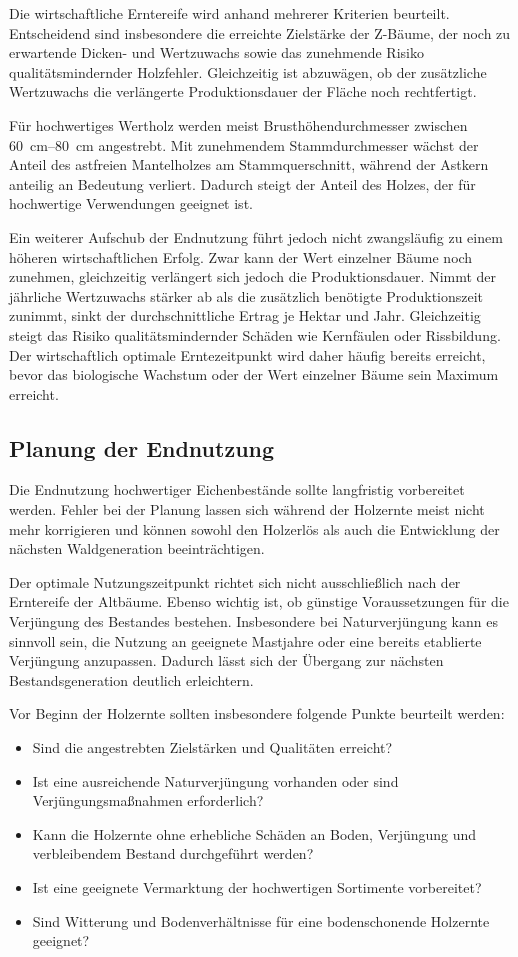 \documentclass[twocolumn, bibliography=totoc, abstract=true]{scrartcl}
\begin{document}
Die wirtschaftliche Erntereife wird anhand mehrerer Kriterien beurteilt. Entscheidend sind insbesondere die erreichte Zielstärke der Z-Bäume, der noch zu erwartende Dicken- und Wertzuwachs sowie das zunehmende Risiko qualitätsmindernder Holzfehler. Gleichzeitig ist abzuwägen, ob der zusätzliche Wertzuwachs die verlängerte Produktionsdauer der Fläche noch rechtfertigt.

Für hochwertiges Wertholz werden meist Brusthöhendurchmesser zwischen \qtyrange{60}{80}{\cm} angestrebt. Mit zunehmendem Stammdurchmesser wächst der Anteil des astfreien Mantelholzes am Stammquerschnitt, während der Astkern anteilig an Bedeutung verliert. Dadurch steigt der Anteil des Holzes, der für hochwertige Verwendungen geeignet ist.

Ein weiterer Aufschub der Endnutzung führt jedoch nicht zwangsläufig zu einem höheren wirtschaftlichen Erfolg. Zwar kann der Wert einzelner Bäume noch zunehmen, gleichzeitig verlängert sich jedoch die Produktionsdauer. Nimmt der jährliche Wertzuwachs stärker ab als die zusätzlich benötigte Produktionszeit zunimmt, sinkt der durchschnittliche Ertrag je Hektar und Jahr. Gleichzeitig steigt das Risiko qualitätsmindernder Schäden wie Kernfäulen oder Rissbildung. Der wirtschaftlich optimale Erntezeitpunkt wird daher häufig bereits erreicht, bevor das biologische Wachstum oder der Wert einzelner Bäume sein Maximum erreicht.

\subsection{Planung der Endnutzung}

Die Endnutzung hochwertiger Eichenbestände sollte langfristig vorbereitet werden. Fehler bei der Planung lassen sich während der Holzernte meist nicht mehr korrigieren und können sowohl den Holzerlös als auch die Entwicklung der nächsten Waldgeneration beeinträchtigen.

Der optimale Nutzungszeitpunkt richtet sich nicht ausschließlich nach der Erntereife der Altbäume. Ebenso wichtig ist, ob günstige Voraussetzungen für die Verjüngung des Bestandes bestehen. Insbesondere bei Naturverjüngung kann es sinnvoll sein, die Nutzung an geeignete Mastjahre oder eine bereits etablierte Verjüngung anzupassen. Dadurch lässt sich der Übergang zur nächsten Bestandsgeneration deutlich erleichtern.

Vor Beginn der Holzernte sollten insbesondere folgende Punkte beurteilt werden:

\begin{itemize}
\item Sind die angestrebten Zielstärken und Qualitäten erreicht?
\item Ist eine ausreichende Naturverjüngung vorhanden oder sind Verjüngungsmaßnahmen erforderlich?
\item Kann die Holzernte ohne erhebliche Schäden an Boden, Verjüngung und verbleibendem Bestand durchgeführt werden?
\item Ist eine geeignete Vermarktung der hochwertigen Sortimente vorbereitet?
\item Sind Witterung und Bodenverhältnisse für eine bodenschonende Holzernte geeignet?
\end{itemize}
\end{document}
